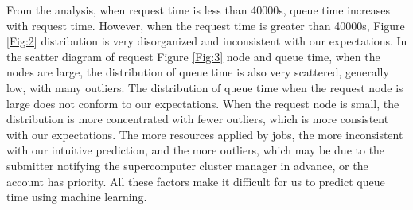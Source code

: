 \documentclass[conference,compsoc]{IEEEtran}
\begin{document}
From the analysis, when request time is less than 40000s, queue time increases with request time. However, when the request time is greater than 40000s, Figure \ref{Fig:2} distribution is very disorganized and inconsistent with our expectations. In the scatter diagram of request Figure \ref{Fig:3} node and queue time, when the nodes are large, the distribution of queue time is also very scattered, generally low, with many outliers. The distribution of queue time when the request node is large does not conform to our expectations. When the request node is small, the distribution is more concentrated with fewer outliers, which is more consistent with our expectations.
The more resources applied by jobs, the more inconsistent with our intuitive prediction, and the more outliers, which may be due to the submitter notifying the supercomputer cluster manager in advance, or the account has priority. All these factors make it difficult for us to predict queue time using machine learning.
\end{document}
